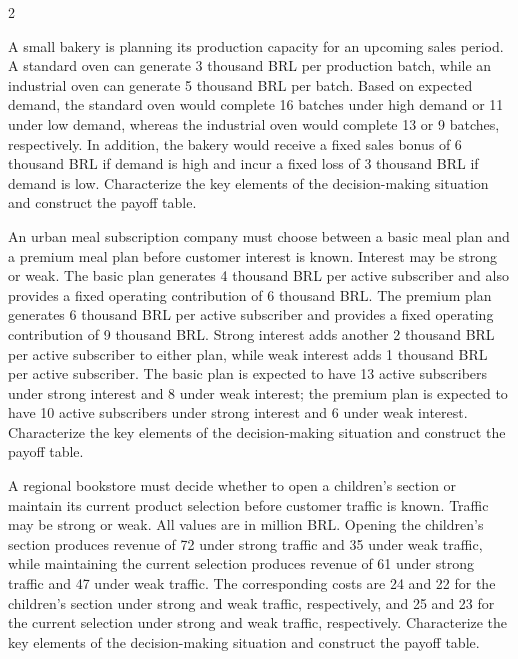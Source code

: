 \begin{multicols}{2}
		\vspace{-4mm}

		
		A small bakery is planning its production capacity for an upcoming sales period. A standard oven can generate 3 thousand BRL per production batch, while an industrial oven can generate 5 thousand BRL per batch. Based on expected demand, the standard oven would complete 16 batches under high demand or 11 under low demand, whereas the industrial oven would complete 13 or 9 batches, respectively. In addition, the bakery would receive a fixed sales bonus of 6 thousand BRL if demand is high and incur a fixed loss of 3 thousand BRL if demand is low.  Characterize the key elements of the decision-making situation and construct the payoff table.

		
				\newpage
				
		An urban meal subscription company must choose between a basic meal plan and a premium meal plan before customer interest is known. Interest may be strong or weak. The basic plan generates 4 thousand BRL per active subscriber and also provides a fixed operating contribution of 6 thousand BRL. The premium plan generates 6 thousand BRL per active subscriber and provides a fixed operating contribution of 9 thousand BRL. Strong interest adds another 2 thousand BRL per active subscriber to either plan, while weak interest adds 1 thousand BRL per active subscriber. The basic plan is expected to have 13 active subscribers under strong interest and 8 under weak interest; the premium plan is expected to have 10 active subscribers under strong interest and 6 under weak interest. Characterize the key elements of the decision-making situation and construct the payoff table.
		
		
		A regional bookstore must decide whether to open a children's section or maintain its current product selection before customer traffic is known. Traffic may be strong or weak. All values are in million BRL. Opening the children's section produces revenue of 72 under strong traffic and 35 under weak traffic, while maintaining the current selection produces revenue of 61 under strong traffic and 47 under weak traffic. The corresponding costs are 24 and 22 for the children's section under strong and weak traffic, respectively, and 25 and 23 for the current selection under strong and weak traffic, respectively. Characterize the key elements of the decision-making situation and construct the payoff table.
		

\end{multicols}
